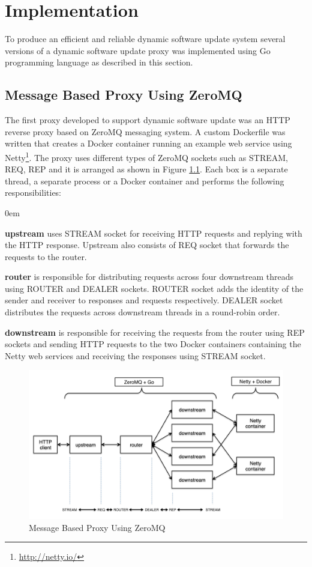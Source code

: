\documentclass[a4paper,11pt,twoside]{report}
\begin{document}
\chapter{Implementation} \label{Implementation}
To produce an efficient and reliable dynamic software update system several versions of a dynamic software update proxy was implemented using Go programming language as described in this section. 

\section{Message Based Proxy Using ZeroMQ}
The first proxy developed to support dynamic software update was an HTTP reverse proxy based on ZeroMQ messaging system. A custom Dockerfile was written that creates a Docker container running an example web service using Netty\footnote{\url{http://netty.io/}}. The proxy uses different types of ZeroMQ sockets such as STREAM, REQ, REP and it is arranged as shown in Figure \ref{prototype}. Each box is a separate thread, a separate process or a Docker container and performs the following responsibilities:
 
\begin{list}{-}{}
  \itemsep0em
  \item \textbf{upstream} uses STREAM socket for receiving HTTP requests and replying with the HTTP response. Upstream also consists of REQ socket that forwards the requests to the router. 
  
  \item \textbf{router} is responsible for distributing requests across four downstream threads using ROUTER and DEALER sockets. ROUTER socket adds the identity of the sender and receiver to responses and requests respectively. DEALER socket distributes the requests across downstream threads in a round-robin order.
 
  \item \textbf{downstream} is responsible for receiving the requests from the router using REP sockets and sending HTTP requests to the two Docker containers containing the Netty web services and receiving the responses using STREAM socket.
\end{list}

\begin{figure}[!ht]
  \centering
     \includegraphics[scale=0.31]{prototype}
  \caption{Message Based Proxy Using ZeroMQ}
  \label{prototype}
\end{figure}
\end{document}
